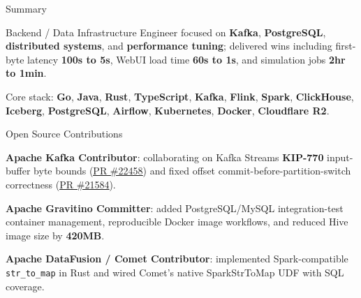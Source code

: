 \documentclass[
	10pt, %
]{resume} %
\begin{document}

\begin{rSection}{Summary}
\begin{rSubsection}{}{}{}{}
            \item Backend / Data Infrastructure Engineer focused on \textbf{Kafka}, \textbf{PostgreSQL}, \textbf{distributed systems}, and \textbf{performance tuning}; delivered wins including first-byte latency \textbf{100s to 5s}, WebUI load time \textbf{60s to 1s}, and simulation jobs \textbf{2hr to 1min}.
            \item Core stack: \textbf{Go}, \textbf{Java}, \textbf{Rust}, \textbf{TypeScript}, \textbf{Kafka}, \textbf{Flink}, \textbf{Spark}, \textbf{ClickHouse}, \textbf{Iceberg}, \textbf{PostgreSQL}, \textbf{Airflow}, \textbf{Kubernetes}, \textbf{Docker}, \textbf{Cloudflare R2}.
	\end{rSubsection}
\end{rSection}


\begin{rSection}{Open Source Contributions}
\begin{rSubsection}{}{}{}{}
		\item \textbf{Apache Kafka Contributor}: collaborating on Kafka Streams \textbf{KIP-770} input-buffer byte bounds ({\color{teal}\underline{\href{https://github.com/apache/kafka/pull/22458}{PR \#22458}}}) and fixed offset commit-before-partition-switch correctness ({\color{teal}\underline{\href{https://github.com/apache/kafka/pull/21584}{PR \#21584}}}).
		\item \textbf{Apache Gravitino Committer}: added PostgreSQL/MySQL integration-test container management, reproducible Docker image workflows, and reduced Hive image size by \textbf{420MB}.
		\item \textbf{Apache DataFusion / Comet Contributor}: implemented Spark-compatible \texttt{str\_to\_map} in Rust and wired Comet's native SparkStrToMap UDF with SQL coverage.
	\end{rSubsection}
\end{rSection}
\end{document}
